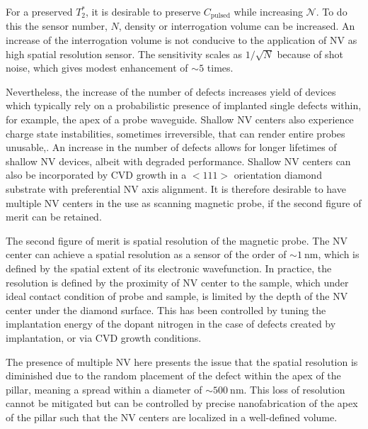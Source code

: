 For a preserved $T_2^*$, it is desirable to preserve $C_{\text{pulsed}}$ while increasing $\mathscr{N}$. To do this the sensor number, $N$, density or interrogation volume can be increased. An increase of the interrogation volume is not conducive to the application of \gls{NV} as high spatial resolution sensor. The sensitivity scales as $1/\sqrt{N}$ because of shot noise, which gives modest enhancement of $\sim5$ times\cite{barrySensitivityOptimizationNVdiamond2020}. 

Nevertheless, the increase of the number of defects increases yield of devices which typically rely on a probabilistic presence of implanted single defects within, for example, the apex of a probe waveguide. Shallow \gls{NV} centers also experience charge state instabilities, sometimes irreversible, that can render entire probes unusable,\cite{neethirajanControlledSurfaceModification2023}. An increase in the number of defects allows for longer lifetimes of shallow \gls{NV} devices, albeit with degraded performance. Shallow \gls{NV} centers can also be incorporated by \gls{CVD} growth in a $<111>$ orientation diamond substrate with preferential \gls{NV} axis alignment\cite{michlPerfectAlignmentPreferential2014}. It is therefore desirable to have multiple \gls{NV} centers in the use as scanning magnetic probe, if the second figure of merit can be retained.

The second figure of merit is spatial resolution of the magnetic probe. The \gls{NV} center can achieve a spatial resolution as a sensor of the order of $\sim\qty{1}{\nano\meter}$, which is defined by the spatial extent of its electronic wavefunction\cite{appelFabricationAllDiamond2016}. In practice, the resolution is defined by the proximity of \gls{NV} center to the sample, which under ideal contact condition of probe and sample, is limited by the depth of the \gls{NV} center under the diamond surface. This has been controlled by tuning the implantation energy of the dopant nitrogen in the case of defects created by implantation\cite{santonocitoNVCentresVacancies2024}, or via \gls{CVD} growth conditions\cite{osterkampEngineeringPreferentiallyalignedNitrogenvacancy2019}. 

The presence of multiple \gls{NV} here presents the issue that the spatial resolution is diminished due to the random placement of the defect within the apex of the pillar, meaning a spread within a diameter of $\sim\qty{500}{\nano\meter}$. This loss of resolution cannot be mitigated but can be controlled by precise nanofabrication of the apex of the pillar such that the \gls{NV} centers are localized in a well-defined volume. 

